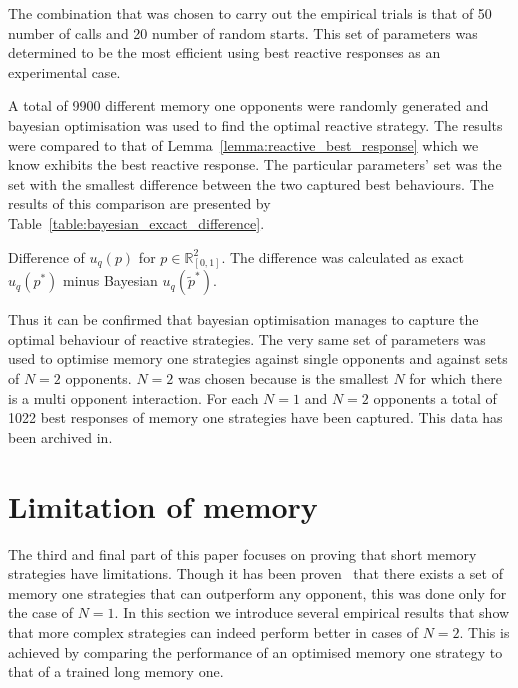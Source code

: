 \documentclass[10pt]{article}
\newcommand{\R}{\mathbb{R}}
\begin{document}
The combination that was chosen to carry out the empirical trials is that
of 50 number of calls and 20 number of random starts. This set of parameters
was determined to be the most efficient using best reactive responses as an experimental
case.

A total of 9900 different memory one opponents were randomly generated and bayesian optimisation
was used to find the optimal reactive strategy. The results were compared to that of
Lemma~\ref{lemma:reactive_best_response} which we know exhibits the best reactive response.
The particular parameters' set was the set with
the smallest difference between the two captured best behaviours.
The results of this comparison are presented by Table~\ref{table:bayesian_excact_difference}.

\begin{table}[htbp]
    \begin{center}
    
    \caption{Difference of \(u_q(p)\) for \(p \in \R_{[0, 1]} ^ 2\). The difference was
    calculated as exact \(u_q(p ^ *)\) minus Bayesian \(u_q(\tilde{p} ^ *)\).}
    \label{table:bayesian_excact_difference}
    \end{center}
\end{table}

Thus it can be confirmed that bayesian optimisation manages to capture the optimal
behaviour of reactive strategies. The very same set of parameters was used to optimise
memory one strategies against single opponents and against
sets of \(N=2\) opponents. \(N=2\) was chosen because is the smallest \(N\) for
which there is a multi opponent interaction. For each \(N=1\) and \(N=2\) opponents a
total of 1022 best responses of memory one strategies have been captured. This data has
been archived in.

\section{Limitation of memory}

The third and final part of this paper focuses on proving that short memory strategies
have limitations. Though it has been proven~\cite{Press2012} that there exists a set
of memory one strategies that can outperform any opponent, this was done only for
the case of \(N=1\). In this section we introduce several empirical results that
show that more complex strategies can indeed perform better in cases of \(N=2\).
This is achieved by comparing the performance of an optimised memory one strategy
to that of a trained long memory one.
\end{document}
